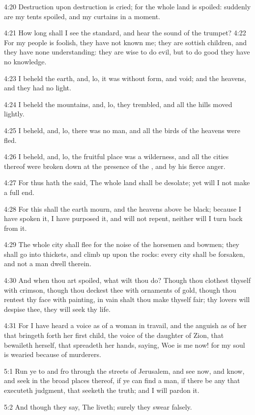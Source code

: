 4:20 Destruction upon destruction is cried; for the whole land is spoiled: suddenly are my tents spoiled, and my curtains in a moment.

4:21 How long shall I see the standard, and hear the sound of the trumpet?  4:22 For my people is foolish, they have not known me; they are sottish children, and they have none understanding: they are wise to do evil, but to do good they have no knowledge.

4:23 I beheld the earth, and, lo, it was without form, and void; and the heavens, and they had no light.

4:24 I beheld the mountains, and, lo, they trembled, and all the hills moved lightly.

4:25 I beheld, and, lo, there was no man, and all the birds of the heavens were fled.

4:26 I beheld, and, lo, the fruitful place was a wilderness, and all the cities thereof were broken down at the presence of the \LORD, and by his fierce anger.

4:27 For thus hath the \LORD said, The whole land shall be desolate; yet will I not make a full end.

4:28 For this shall the earth mourn, and the heavens above be black; because I have spoken it, I have purposed it, and will not repent, neither will I turn back from it.

4:29 The whole city shall flee for the noise of the horsemen and bowmen; they shall go into thickets, and climb up upon the rocks: every city shall be forsaken, and not a man dwell therein.

4:30 And when thou art spoiled, what wilt thou do? Though thou clothest thyself with crimson, though thou deckest thee with ornaments of gold, though thou rentest thy face with painting, in vain shalt thou make thyself fair; thy lovers will despise thee, they will seek thy life.

4:31 For I have heard a voice as of a woman in travail, and the anguish as of her that bringeth forth her first child, the voice of the daughter of Zion, that bewaileth herself, that spreadeth her hands, saying, Woe is me now! for my soul is wearied because of murderers.

5:1 Run ye to and fro through the streets of Jerusalem, and see now, and know, and seek in the broad places thereof, if ye can find a man, if there be any that executeth judgment, that seeketh the truth; and I will pardon it.

5:2 And though they say, The \LORD liveth; surely they swear falsely.

